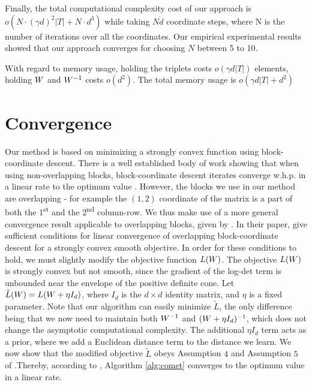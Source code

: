 \documentclass{article}
\begin{document}
Finally, the total computational complexity cost of our approach is $o(N \cdot (\gamma d)^2 |T| + N \cdot d^3)$ while taking $N \dot d$ coordinate steps, where N is the number of iterations over all the coordinates. Our empirical experimental results showed that our approach converges for choosing $N$ between 5 to 10. 

With regard to memory usage, holding the triplets costs $o(\gamma d |T|)$ elements, holding ${W}$ and ${W}^{-1}$ costs $o(d^2)$. The total memory usage is $o(\gamma d |T| + d^2)$
\section{Convergence}
Our method is based on minimizing a strongly convex function using block-coordinate descent. There is a well established body of work showing that when using non-overlapping blocks, block-coordinate descent iterates converge w.h.p. in a linear rate to the optimum value \cite{nesterov2012efficiency,richtarik2014iteration}.
However, the blocks we use in our method are overlapping - for example the $(1,2)$ coordinate of the matrix is a part of both the 1\textsuperscript{st} and the 2\textsuperscript{nd} column-row. We thus make use of a more general convergence result applicable to overlapping blocks, given by \citet{richtarik2013optimal}. 
In their paper, \citet{richtarik2013optimal} give sufficient conditions for linear convergence of overlapping block-coordinate descent for a strongly convex smooth objective.
In order for these conditions to hold, we must slightly modify the objective function $L({{W}})$. The objective $L({W})$ is strongly convex but not smooth, since the gradient of the log-det term is unbounded near the envelope of the positive definite cone. Let $\tilde{L}({{W}}) = L({{W} + \eta I_d})$, where $I_d$ is the $d \times d$ identity matrix, and $\eta$ is a fixed parameter.
Note that our algorithm can easily minimize $\tilde{L}$, the only difference being that we now need to maintain both ${W}^{-1}$ and $({W}+\eta I_d)^{-1}$, which does not change the asymptotic computational complexity. The additional $\eta I_d$ term acts as a prior, where we add a Euclidean distance term to the distance we learn. 
We now show that the modified objective $\tilde{L}$ obeys Assumption $4$ and Assumption $5$ of \citet{richtarik2013optimal}.Thereby, according to \citet[Theorems 3 and 7]{richtarik2013optimal}, Algorithm \ref{alg:comet} converges to the optimum value in a linear rate.
\end{document}
